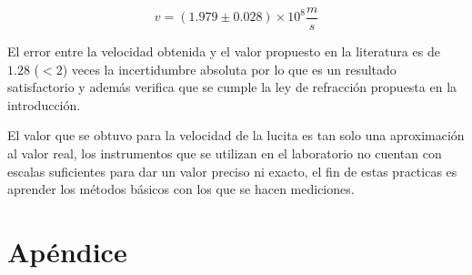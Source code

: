 \documentclass[DIV=calc, paper=a4, fontsize=11pt]{scrartcl}
\begin{document}
\begin{equation*}
    v= (1.979 \pm 0.028) \times 10^{8} \frac{m}{s}
\end{equation*}

El error entre la velocidad obtenida y el valor propuesto en la literatura  es de $1.28$ ($<2$) veces la incertidumbre absoluta por lo que es un resultado satisfactorio y además verifica que se cumple la ley de refracción propuesta en la introducción. %

El valor que se obtuvo  para la velocidad de la lucita es tan solo una aproximación al valor real, los instrumentos que se utilizan en el laboratorio no cuentan con escalas suficientes para dar un valor preciso ni exacto, el fin de estas practicas es aprender los métodos básicos con los que se hacen mediciones.



\newpage
\section*{\textcolor{carmine}{Apéndice}}
\end{document}

